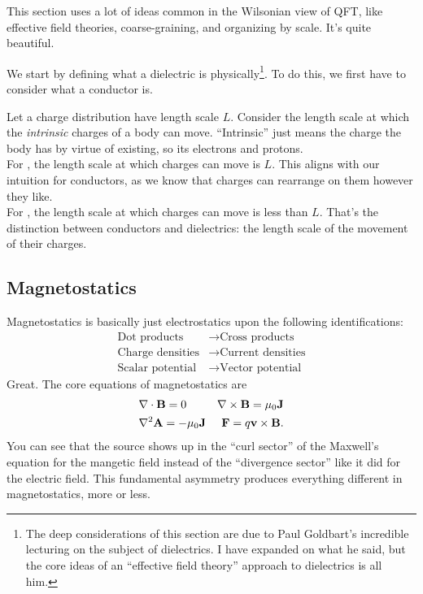 \documentclass[11pt]{article}
\begin{document}
\begin{reemark}
    This section uses a lot of ideas common in the Wilsonian
    view of QFT, like effective field theories, coarse-graining,
    and organizing by scale. It's quite beautiful.
\end{reemark}

We start by defining what a dielectric is physically\footnote{The
deep considerations of this section are due to Paul Goldbart's
incredible lecturing on the subject of dielectrics. I have expanded
on what he said, but the core ideas of an ``effective field theory''
approach to dielectrics is all him.}. To do this, we first have
to consider what a conductor is.

\begin{iidea}
    Let a charge distribution have length scale $L$.
    Consider the length scale at which the \emph{intrinsic} charges of a body
    can move. ``Intrinsic'' just means the charge the body has by virtue of existing,
    so its electrons and protons.\\

    For , the length scale at which charges can move is $L$.
    This aligns with our intuition for conductors, as we know that charges
    can rearrange on them however they like.\\

    For , the length scale at which charges can move is less
    than $L$. That's the distinction between conductors and dielectrics:
    the length scale of the movement of their charges.
\end{iidea}

\subsection{Magnetostatics}

Magnetostatics is basically just electrostatics
upon the following identifications:
\begin{align*}
    \text{Dot products} & \longrightarrow \text{Cross products}\\
    \text{Charge densities} & \longrightarrow \text{Current densities}\\
    \text{Scalar potential} & \longrightarrow \text{Vector potential}
\end{align*}
Great. The core equations of magnetostatics are
\begin{align*}
    & \nabla \cdot \mathbf{B} = 0 & \nabla \times \mathbf{B} = \mu_0 \mathbf{J}\\
    & \nabla^2 \mathbf{A} = - \mu_0 \mathbf{J} & \mathbf{F} = q \mathbf{v} \times \mathbf{B}.
\end{align*}
You can see that the source shows up in the ``curl sector'' of
the Maxwell's equation for the mangetic field instead of the ``divergence sector''
like it did for the electric field. This fundamental
asymmetry produces everything different in magnetostatics,
more or less.
\end{document}

